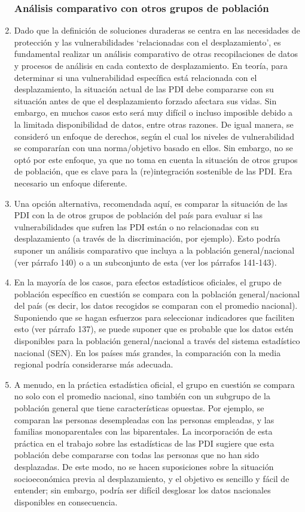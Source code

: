 \documentclass[
]{book}
\begin{document}
\begin{enumerate}
{  \subsubsection{Análisis comparativo con otros grupos de población}\label{anuxe1lisis-comparativo-con-otros-grupos-de-poblaciuxf3n}}
\item
  Dado que la definición de soluciones duraderas se centra en las necesidades de protección y las vulnerabilidades `relacionadas con el desplazamiento', es fundamental realizar un análisis comparativo de otras recopilaciones de datos y procesos de análisis en cada contexto de desplazamiento. En teoría, para determinar si una vulnerabilidad específica está relacionada con el desplazamiento, la situación actual de las PDI debe compararse con su situación antes de que el desplazamiento forzado afectara sus vidas. Sin embargo, en muchos casos esto será muy difícil o incluso imposible debido a la limitada disponibilidad de datos, entre otras razones. De igual manera, se consideró un enfoque de derechos, según el cual los niveles de vulnerabilidad se compararían con una norma/objetivo basado en ellos. Sin embargo, no se optó por este enfoque, ya que no toma en cuenta la situación de otros grupos de población, que es clave para la (re)integración sostenible de las PDI. Era necesario un enfoque diferente.
\item
  Una opción alternativa, recomendada aquí, es comparar la situación de las PDI con la de otros grupos de población del país para evaluar si las vulnerabilidades que sufren las PDI están o no relacionadas con su desplazamiento (a través de la discriminación, por ejemplo). Esto podría suponer un análisis comparativo que incluya a la población general/nacional (ver párrafo 140) o a un subconjunto de esta (ver los párrafos 141-143).
\item
  En la mayoría de los casos, para efectos estadísticos oficiales, el grupo de población específico en cuestión se compara con la población general/nacional del país (es decir, los datos recogidos se comparan con el promedio nacional). Suponiendo que se hagan esfuerzos para seleccionar indicadores que faciliten esto (ver párrafo 137), se puede suponer que es probable que los datos estén disponibles para la población general/nacional a través del sistema estadístico nacional (SEN). En los países más grandes, la comparación con la media regional podría considerarse más adecuada.
\item
  A menudo, en la práctica estadística oficial, el grupo en cuestión se compara no solo con el promedio nacional, sino también con un subgrupo de la población general que tiene características opuestas. Por ejemplo, se comparan las personas desempleadas con las personas empleadas, y las familias monoparentales con las biparentales. La incorporación de esta práctica en el trabajo sobre las estadísticas de las PDI sugiere que esta población debe compararse con todas las personas que no han sido desplazadas. De este modo, no se hacen suposiciones sobre la situación socioeconómica previa al desplazamiento, y el objetivo es sencillo y fácil de entender; sin embargo, podría ser difícil desglosar los datos nacionales disponibles en consecuencia.

\end{enumerate}
\end{document}
